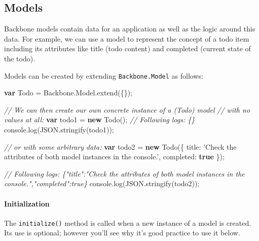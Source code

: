 \documentclass[9pt]{book}
\newenvironment{Shaded}{}{}
\newcommand{\KeywordTok}[1]{\textcolor[rgb]{0.00,0.44,0.13}{\textbf{{#1}}}}
\newcommand{\DataTypeTok}[1]{\textcolor[rgb]{0.56,0.13,0.00}{{#1}}}
\newcommand{\StringTok}[1]{\textcolor[rgb]{0.25,0.44,0.63}{{#1}}}
\newcommand{\CommentTok}[1]{\textcolor[rgb]{0.38,0.63,0.69}{\textit{{#1}}}}
\newcommand{\OtherTok}[1]{\textcolor[rgb]{0.00,0.44,0.13}{{#1}}}
\newcommand{\FunctionTok}[1]{\textcolor[rgb]{0.02,0.16,0.49}{{#1}}}
\newcommand{\NormalTok}[1]{{#1}}
\begin{document}
\subsection{Models}\label{models-1}

Backbone models contain data for an application as well as the logic
around this data. For example, we can use a model to represent the
concept of a todo item including its attributes like title (todo
content) and completed (current state of the todo).

Models can be created by extending \texttt{Backbone.Model} as follows:

\begin{Shaded}
\begin{Highlighting}[]
\KeywordTok{var} \NormalTok{Todo = }\OtherTok{Backbone}\NormalTok{.}\OtherTok{Model}\NormalTok{.}\FunctionTok{extend}\NormalTok{(\{\});}

\CommentTok{// We can then create our own concrete instance of a (Todo) model}
\CommentTok{// with no values at all:}
\KeywordTok{var} \NormalTok{todo1 = }\KeywordTok{new} \FunctionTok{Todo}\NormalTok{();}
\CommentTok{// Following logs: \{\}}
\OtherTok{console}\NormalTok{.}\FunctionTok{log}\NormalTok{(}\OtherTok{JSON}\NormalTok{.}\FunctionTok{stringify}\NormalTok{(todo1));}

\CommentTok{// or with some arbitrary data:}
\KeywordTok{var} \NormalTok{todo2 = }\KeywordTok{new} \FunctionTok{Todo}\NormalTok{(\{}
  \DataTypeTok{title}\NormalTok{: }\StringTok{'Check the attributes of both model instances in the console.'}\NormalTok{,}
  \DataTypeTok{completed}\NormalTok{: }\KeywordTok{true}
\NormalTok{\});}

\CommentTok{// Following logs: \{"title":"Check the attributes of both model instances in the console.","completed":true\}}
\OtherTok{console}\NormalTok{.}\FunctionTok{log}\NormalTok{(}\OtherTok{JSON}\NormalTok{.}\FunctionTok{stringify}\NormalTok{(todo2));}
\end{Highlighting}
\end{Shaded}

\paragraph{Initialization}\label{initialization}

The \texttt{initialize()} method is called when a new instance of a
model is created. Its use is optional; however you'll see why it's good
practice to use it below.
\end{document}
